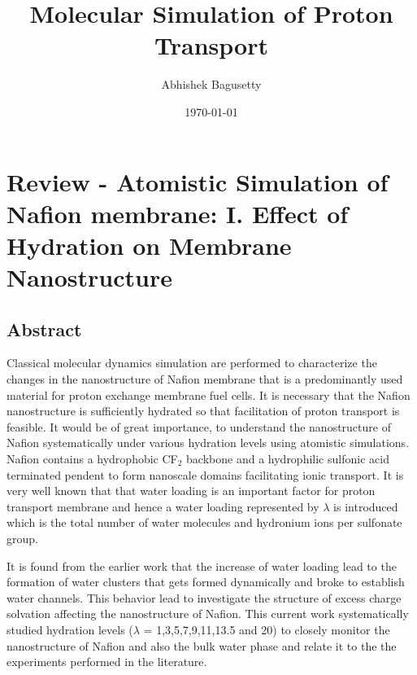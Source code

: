 \documentclass{article}
\author{Abhishek Bagusetty}
\date{\today}
\title{Molecular Simulation of Proton Transport}
\begin{document}
\maketitle

\section{Review - Atomistic Simulation of Nafion membrane: I. Effect of Hydration on Membrane Nanostructure}
\label{sec-1}
\subsection{Abstract}
\label{sec-1-1}
Classical molecular dynamics simulation are performed to characterize the changes in the nanostructure of Nafion membrane that is a predominantly used material for proton exchange membrane fuel cells. It is necessary that the Nafion nanostructure is sufficiently hydrated so that facilitation of proton transport is feasible. It would be of great importance, to understand the nanostructure of Nafion systematically under various hydration levels using atomistic simulations. Nafion contains a hydrophobic CF$_{\text{2}}$ backbone and a hydrophilic sulfonic acid terminated pendent to form nanoscale domains facilitating ionic transport. It is very well known that that water loading is an important factor for proton transport membrane and hence a water loading represented by $\lambda$ is introduced which is the total number of water molecules and hydronium ions per sulfonate group.

It is found from the earlier work that the increase of water loading lead to the formation of water clusters that gets formed dynamically and broke to establish water channels. This behavior lead to investigate the structure of excess charge solvation affecting the nanostructure of Nafion. This current work systematically studied hydration levels ($\lambda$ = 1,3,5,7,9,11,13.5 and 20) to closely monitor the nanostructure of Nafion and also the bulk water phase and relate it to the the experiments performed in the literature.
\end{document}
